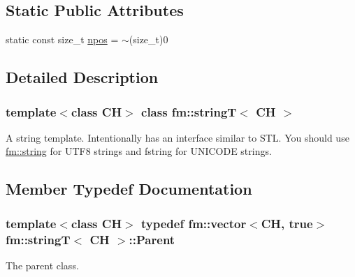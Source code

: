 \subsection*{Static Public Attributes}
\begin{DoxyCompactItemize}
\item 
static const size\_\-t \hyperlink{classfm_1_1stringT_a1713528ab4d3f25c806389871be1a04f}{npos} = $\sim$(size\_\-t)0
\end{DoxyCompactItemize}


\subsection{Detailed Description}
\subsubsection*{template$<$class CH$>$ class fm::stringT$<$ CH $>$}

A string template. Intentionally has an interface similar to STL. You should use \hyperlink{namespacefm_ac112eb8f56d62ea729aa6d1edd7233a4}{fm::string} for UTF8 strings and fstring for UNICODE strings. 

\subsection{Member Typedef Documentation}
\hypertarget{classfm_1_1stringT_a55d7525122109f4cc7cf052cf11dbe5e}{
\subsubsection[{Parent}]{\setlength{\rightskip}{0pt plus 5cm}template$<$class CH$>$ typedef {\bf fm::vector}$<$CH, true$>$ {\bf fm::stringT}$<$ CH $>$::{\bf Parent}}}
\label{classfm_1_1stringT_a55d7525122109f4cc7cf052cf11dbe5e}
The parent class. 

